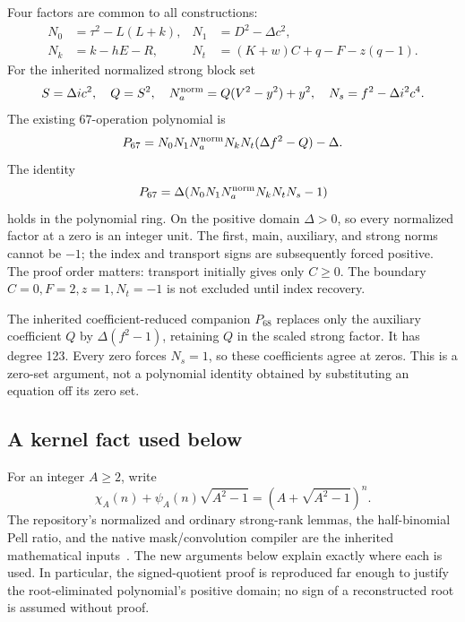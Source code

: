 \documentclass[11pt,a4paper]{article}
\theoremstyle{remark}\newtheorem{remark}[theorem]{Remark}
\begin{document}
Four factors are common to all constructions:
\begin{align}
 N_0&=\tau^2-L(L+k),&N_1&=D^2-\Delta c^2,\nonumber\\
 N_k&=k-hE-R,&N_t&=(K+w)C+q-F-z(q-1).\label{eq:fourfactors}
\end{align}
For the inherited normalized strong block set
\begin{equation}
 S=\Delta ic^2,\quad Q=S^2,\quad
 N_a^{\rm norm}=Q(V^2-y^2)+y^2,\quad
 N_s=f^2-\Delta i^2c^4.\label{eq:normalized}
\end{equation}
The existing 67-operation polynomial is
\begin{equation}
 P_{67}=N_0N_1N_a^{\rm norm}N_kN_t(\Delta f^2-Q)-\Delta.
 \label{eq:p67}
\end{equation}
The identity
\[
 P_{67}=\Delta(N_0N_1N_a^{\rm norm}N_kN_tN_s-1)
\]
holds in the polynomial ring. On the positive domain \(\Delta>0\), so
every normalized factor at a zero is an integer unit. The first,
main, auxiliary, and strong norms cannot be \(-1\); the index and
transport signs are subsequently forced positive. The proof order matters:
transport initially gives only \(C\ge0\). The boundary
\(C=0,F=2,z=1,N_t=-1\) is not excluded until index recovery.

The inherited coefficient-reduced companion \(P_{68}\) replaces only the
auxiliary coefficient \(Q\) by \(\Delta(f^2-1)\), retaining \(Q\) in
the scaled strong factor. It has degree 123. Every zero forces \(N_s=1\),
so these coefficients agree at zeros. This is a zero-set argument, not a
polynomial identity obtained by substituting an equation off its zero set.

\subsection{A kernel fact used below}

For an integer \(A\ge2\), write
\[
 \chi_A(n)+\psi_A(n)\sqrt{A^2-1}
   =(A+\sqrt{A^2-1})^n.
\]
The repository's normalized and ordinary strong-rank lemmas, the
half-binomial Pell ratio, and the native mask/convolution compiler are the
inherited mathematical inputs~\cite{relaxed,normalized,masks,src06}.
The new arguments below explain exactly where each is used. In particular,
the signed-quotient proof is reproduced far enough to justify the
root-eliminated polynomial's positive domain; no sign of a reconstructed
root is assumed without proof.


\end{document}
